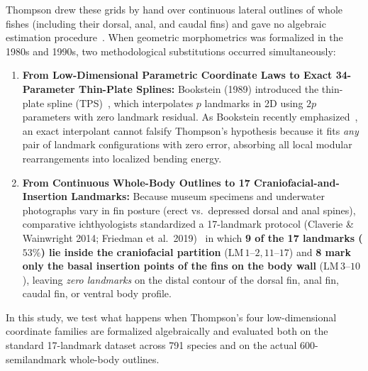 \documentclass[11pt,a4paper]{article}
\theoremstyle{definition}
\theoremstyle{remark}
\begin{document}
Thompson drew these grids by hand over continuous lateral outlines of whole fishes (including their dorsal, anal, and caudal fins) and gave no algebraic estimation procedure~\cite{Bookstein1978}. When geometric morphometrics was formalized in the 1980s and 1990s, two methodological substitutions occurred simultaneously:
\begin{enumerate}
  \item \textbf{From Low-Dimensional Parametric Coordinate Laws to Exact 34-Parameter Thin-Plate Splines:} Bookstein (1989) introduced the thin-plate spline (TPS)~\cite{Bookstein1989}, which interpolates $p$ landmarks in 2D using $2p$ parameters with zero landmark residual. As Bookstein recently emphasized~\cite{Bookstein2023,Bookstein2024}, an exact interpolant cannot falsify Thompson's hypothesis because it fits \emph{any} pair of landmark configurations with zero error, absorbing all local modular rearrangements into localized bending energy.
  \item \textbf{From Continuous Whole-Body Outlines to 17 Craniofacial-and-Insertion Landmarks:} Because museum specimens and underwater photographs vary in fin posture (erect vs.\ depressed dorsal and anal spines), comparative ichthyologists standardized a 17-landmark protocol (Claverie \& Wainwright 2014; Friedman et al.\ 2019)~\cite{ClaverieWainwright2014,Friedman2019} in which \textbf{9 of the 17 landmarks ($53\%$) lie inside the craniofacial partition} ($\mathrm{LM}\,1\text{--}2, 11\text{--}17$) and \textbf{8 mark only the basal insertion points of the fins on the body wall} ($\mathrm{LM}\,3\text{--}10$), leaving \emph{zero landmarks} on the distal contour of the dorsal fin, anal fin, caudal fin, or ventral body profile.
\end{enumerate}

In this study, we test what happens when Thompson's four low-dimensional coordinate families are formalized algebraically and evaluated both on the standard 17-landmark dataset across 791 species and on the actual 600-semilandmark whole-body outlines.
\end{document}
